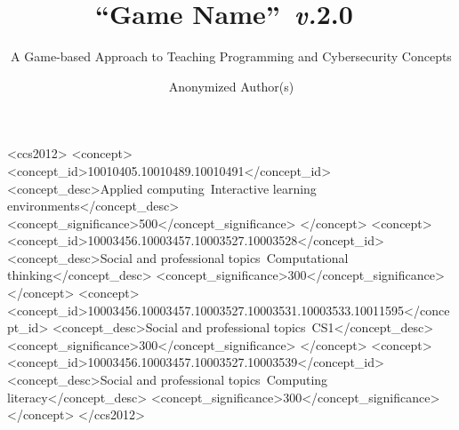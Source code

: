 \documentclass[sigconf]{acmart}
\newcommand{\gameNameNS}{``Game Name''}
\newcommand{\gameName}{\gameNameNS~}
\newcommand{\pwTwo}{\gameName \emph{v.}2.0~}
\begin{document}
\fancyhead{}

\title{\pwTwo}
\subtitle{A Game-based Approach to Teaching Programming and Cybersecurity Concepts}




\author{Anonymized Author(s)}




% 

\begin{abstract}

\end{abstract}

%
%
\begin{CCSXML}
	<ccs2012>
	<concept>
	<concept_id>10010405.10010489.10010491</concept_id>
	<concept_desc>Applied computing~Interactive learning environments</concept_desc>
	<concept_significance>500</concept_significance>
	</concept>
	<concept>
	<concept_id>10003456.10003457.10003527.10003528</concept_id>
	<concept_desc>Social and professional topics~Computational thinking</concept_desc>
	<concept_significance>300</concept_significance>
	</concept>
	<concept>
	<concept_id>10003456.10003457.10003527.10003531.10003533.10011595</concept_id>
	<concept_desc>Social and professional topics~CS1</concept_desc>
	<concept_significance>300</concept_significance>
	</concept>
	<concept>
	<concept_id>10003456.10003457.10003527.10003539</concept_id>
	<concept_desc>Social and professional topics~Computing literacy</concept_desc>
	<concept_significance>300</concept_significance>
	</concept>
	</ccs2012>
\end{CCSXML}
\end{document}
